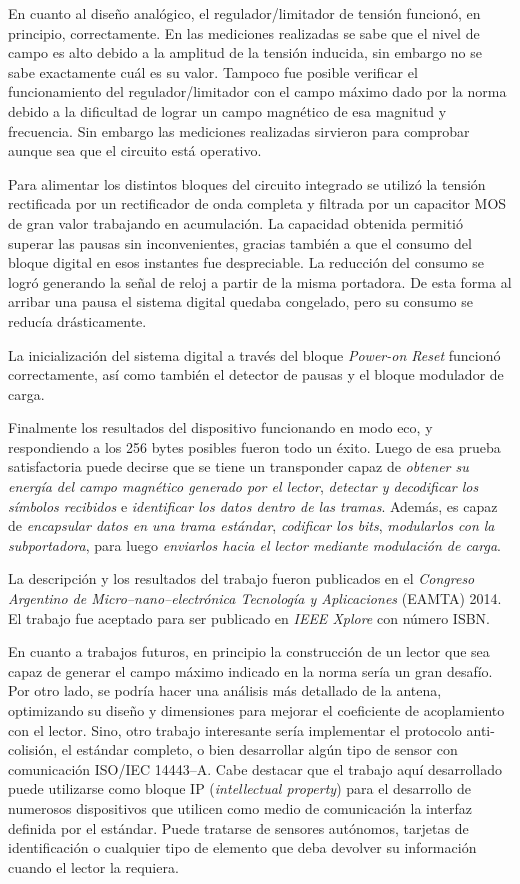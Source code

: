 En cuanto al diseño analógico, el regulador/limitador de tensión 
funcionó, en principio, correctamente. En las mediciones realizadas se 
sabe que el nivel de campo es alto debido a la amplitud de la tensión 
inducida, sin embargo no se sabe exactamente cuál es su valor. Tampoco 
fue posible verificar el funcionamiento del regulador/limitador con el 
campo máximo dado por la norma debido a la dificultad de lograr un 
campo magnético de esa magnitud y frecuencia. Sin embargo las 
mediciones realizadas sirvieron para comprobar aunque sea que el 
circuito está operativo.

Para alimentar los distintos bloques del circuito integrado se 
utilizó la tensión rectificada por un rectificador de onda completa y 
filtrada por un capacitor MOS de gran valor trabajando en acumulación. 
La capacidad obtenida permitió superar las pausas sin inconvenientes, 
gracias también a que el consumo del bloque digital en esos instantes 
fue despreciable. La reducción del consumo se logró generando la 
señal de reloj a partir de la misma portadora. De esta forma al 
arribar una pausa el sistema digital quedaba congelado, pero su 
consumo se reducía drásticamente.

La inicialización del sistema digital a través del bloque 
\emph{Power-on Reset} funcionó correctamente, así como también el 
detector de pausas y el bloque modulador de carga.

Finalmente los resultados del dispositivo funcionando en modo eco, y 
respondiendo a los 256 bytes posibles fueron todo un éxito. Luego de 
esa prueba satisfactoria puede decirse que se tiene un transponder 
capaz de \emph{obtener su energía del campo magnético generado por el 
lector}, \emph{detectar y decodificar los símbolos recibidos} e 
\emph{identificar los datos dentro de las tramas}. Además, es capaz de 
\emph{encapsular datos en una trama estándar}, \emph{codificar los 
bits}, \emph{modularlos con la subportadora}, para luego 
\emph{enviarlos hacia el lector mediante modulación de carga}.

La descripción y los resultados del trabajo fueron publicados en el 
\emph{Congreso Argentino de Micro--nano--electrónica Tecnología y 
Aplicaciones} (EAMTA) 2014. El trabajo fue aceptado para ser publicado 
en \emph{IEEE Xplore} con número ISBN.

En cuanto a trabajos futuros, en principio la construcción de un 
lector que sea capaz de generar el campo máximo indicado en la norma 
sería un gran desafío. Por otro lado, se podría hacer una análisis más 
detallado de la antena, optimizando su diseño y dimensiones para 
mejorar el coeficiente de acoplamiento con el lector. Sino, otro trabajo 
interesante sería implementar el protocolo anti-colisión, el 
estándar completo, o bien desarrollar algún tipo de sensor con 
comunicación ISO/IEC 14443--A. Cabe destacar que el trabajo aquí 
desarrollado puede utilizarse como bloque IP (\emph{intellectual 
property}) para el desarrollo de numerosos dispositivos que utilicen 
como medio de comunicación la interfaz definida por el estándar. 
Puede tratarse de sensores autónomos, tarjetas de identificación o 
cualquier tipo de elemento que deba devolver su información cuando el 
lector la requiera.
